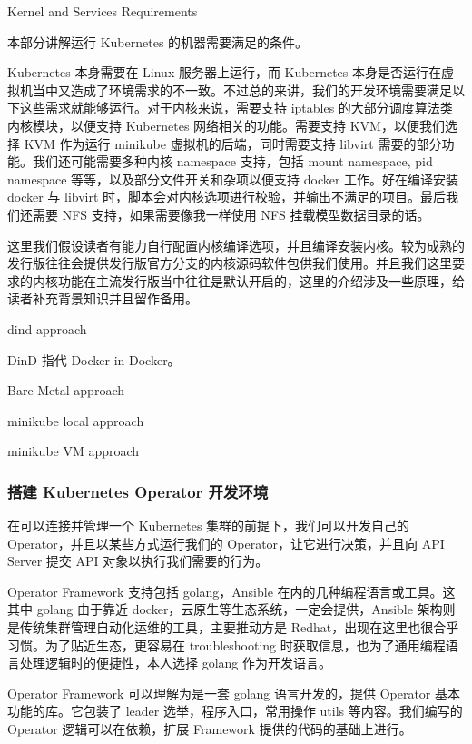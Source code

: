 
Kernel and Services Requirements

本部分讲解运行 Kubernetes 的机器需要满足的条件。

Kubernetes 本身需要在 Linux 服务器上运行，而 Kubernetes 本身是否运行在虚拟机当中又造成了环境需求的不一致。不过总的来讲，我们的开发环境需要满足以下这些需求就能够运行。对于内核来说，需要支持 iptables 的大部分调度算法类内核模块，以便支持 Kubernetes 网络相关的功能。需要支持 KVM，以便我们选择 KVM 作为运行 minikube 虚拟机的后端，同时需要支持 libvirt 需要的部分功能。我们还可能需要多种内核 namespace 支持，包括 mount namespace, pid namespace 等等，以及部分文件开关和杂项以便支持 docker 工作。好在编译安装 docker 与 libvirt 时，脚本会对内核选项进行校验，并输出不满足的项目。最后我们还需要 NFS 支持，如果需要像我一样使用 NFS 挂载模型数据目录的话。

这里我们假设读者有能力自行配置内核编译选项，并且编译安装内核。较为成熟的发行版往往会提供发行版官方分支的内核源码软件包供我们使用。并且我们这里要求的内核功能在主流发行版当中往往是默认开启的，这里的介绍涉及一些原理，给读者补充背景知识并且留作备用。


dind approach

DinD 指代 Docker in Docker。

Bare Metal approach

minikube local approach

minikube VM approach

\subsubsection{搭建 Kubernetes Operator 开发环境}

在可以连接并管理一个 Kubernetes 集群的前提下，我们可以开发自己的 Operator，并且以某些方式运行我们的 Operator，让它进行决策，并且向 API Server 提交 API 对象以执行我们需要的行为。

Operator Framework 支持包括 golang，Ansible 在内的几种编程语言或工具。这其中 golang 由于靠近 docker，云原生等生态系统，一定会提供，Ansible 架构则是传统集群管理自动化运维的工具，主要推动方是 Redhat，出现在这里也很合乎习惯。为了贴近生态，更容易在 troubleshooting 时获取信息，也为了通用编程语言处理逻辑时的便捷性，本人选择 golang 作为开发语言。

Operator Framework 可以理解为是一套 golang 语言开发的，提供 Operator 基本功能的库。它包装了 leader 选举，程序入口，常用操作 utils 等内容。我们编写的 Operator 逻辑可以在依赖，扩展 Framework 提供的代码的基础上进行。

